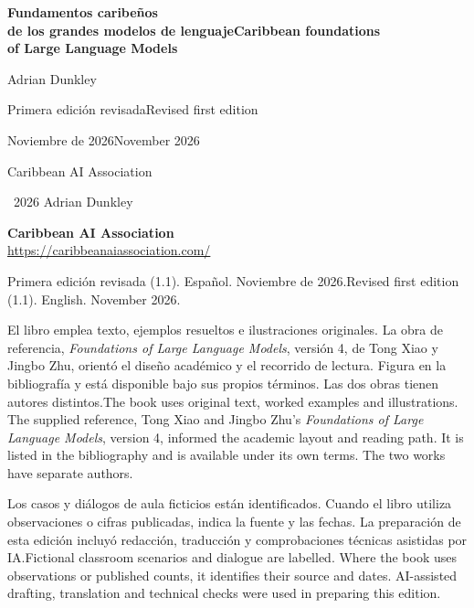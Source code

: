 \documentclass[11pt,a4paper,twoside,openany]{book}
\newcommand{\B}[2]{\ifES#2\else#1\fi}
\begin{document}
\frontmatter
\begin{titlepage}
\centering
\vspace*{33mm}
{\Huge\bfseries\B{Caribbean foundations\\[3pt]of Large Language Models}{Fundamentos caribeños\\[3pt]de los grandes modelos de lenguaje}\par}
\vspace{28mm}
{\Large Adrian Dunkley\par}
\vspace{28mm}
{\large \B{Revised first edition}{Primera edición revisada}\par}
\vspace{4mm}
{\large \B{November 2026}{Noviembre de 2026}\par}
\vfill
{\large Caribbean AI Association\par}
\vspace{15mm}
\end{titlepage}
\thispagestyle{empty}
\noindent\textcopyright\ 2026 Adrian Dunkley

\bigskip
\noindent\textbf{Caribbean AI Association}\\
\url{https://caribbeanaiassociation.com/}

\bigskip
\noindent\B{Revised first edition (1.1). English. November 2026.}{Primera edición revisada (1.1). Español. Noviembre de 2026.}

\bigskip
\noindent\B{The book uses original text, worked examples and illustrations. The supplied reference, Tong Xiao and Jingbo Zhu's \emph{Foundations of Large Language Models}, version 4, informed the academic layout and reading path. It is listed in the bibliography and is available under its own terms. The two works have separate authors.}{El libro emplea texto, ejemplos resueltos e ilustraciones originales. La obra de referencia, \emph{Foundations of Large Language Models}, versión 4, de Tong Xiao y Jingbo Zhu, orientó el diseño académico y el recorrido de lectura. Figura en la bibliografía y está disponible bajo sus propios términos. Las dos obras tienen autores distintos.}

\medskip
\noindent\B{Fictional classroom scenarios and dialogue are labelled. Where the book uses observations or published counts, it identifies their source and dates. AI-assisted drafting, translation and technical checks were used in preparing this edition.}{Los casos y diálogos de aula ficticios están identificados. Cuando el libro utiliza observaciones o cifras publicadas, indica la fuente y las fechas. La preparación de esta edición incluyó redacción, traducción y comprobaciones técnicas asistidas por IA.}
\end{document}
